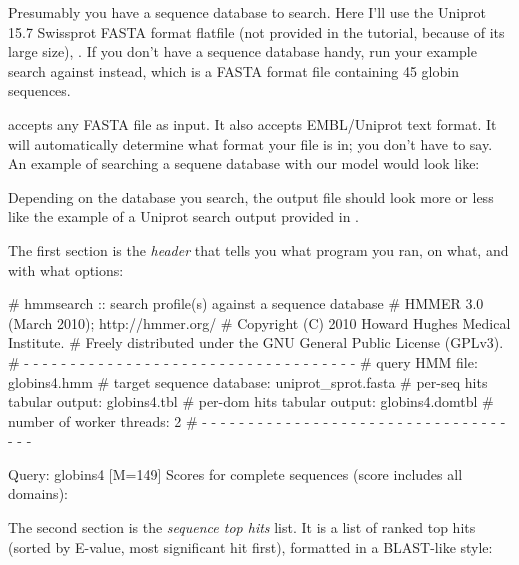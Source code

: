 Presumably you have a sequence database to search. Here I'll use the
Uniprot 15.7 Swissprot FASTA format flatfile (not provided in the
tutorial, because of its large size), .  If
you don't have a sequence database handy, run your example search
against  instead, which is a FASTA format
file containing 45 globin sequences.

 accepts any FASTA file as input. It also accepts
EMBL/Uniprot text format. It will automatically determine what format
your file is in; you don't have to say. An example of searching a
sequene database with our  model would look like:


Depending on the database you search, the output file
 should look more or less like the example of a
Uniprot search output provided in .

The first section is the \emph{header} that tells you what program you
ran, on what, and with what options:

\begin{sreoutput}
# hmmsearch :: search profile(s) against a sequence database
# HMMER 3.0 (March 2010); http://hmmer.org/
# Copyright (C) 2010 Howard Hughes Medical Institute.
# Freely distributed under the GNU General Public License (GPLv3).
# - - - - - - - - - - - - - - - - - - - - - - - - - - - - - - - - - - - -
# query HMM file:                  globins4.hmm
# target sequence database:        uniprot_sprot.fasta
# per-seq hits tabular output:     globins4.tbl
# per-dom hits tabular output:     globins4.domtbl
# number of worker threads:        2
# - - - - - - - - - - - - - - - - - - - - - - - - - - - - - - - - - - - -

Query:       globins4  [M=149]
Scores for complete sequences (score includes all domains):
\end{sreoutput}

The second section is the \emph{sequence top hits} list. It is a list
of ranked top hits (sorted by E-value, most significant hit first),
formatted in a BLAST-like style:

